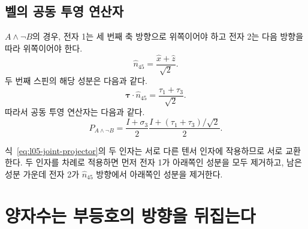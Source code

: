 \subsection{벨의 공동 투영 연산자}

\(A\wedge\neg B\)의 경우, 전자 1는 세 번째 축 방향으로 위쪽이어야 하고 전자 2는 다음 방향을 따라 위쪽이어야 한다.
\begin{equation}
  \hat n_{45}=\frac{\hat x+\hat z}{\sqrt2}.
\end{equation}
두 번째 스핀의 해당 성분은 다음과 같다.
\begin{equation}
  \boldsymbol{\tau}\cdot\hat n_{45}
  =
  \frac{\tau_1+\tau_3}{\sqrt2}.
\end{equation}
따라서 공동 투영 연산자는 다음과 같다.
\begin{equation}
  P_{A\wedge\neg B}
  =
  \frac{I+\sigma_3}{2}
  \frac{I+(\tau_1+\tau_3)/\sqrt2}{2}.
  \label{eq:l05-joint-projector}
\end{equation}

\begin{classroomqa}
\end{classroomqa}

\begin{classroomqa}
\end{classroomqa}

식~\eqref{eq:l05-joint-projector}의 두 인자는 서로 다른 텐서 인자에 작용하므로 서로 교환한다. 두 인자를 차례로 적용하면 먼저 전자 1가 아래쪽인 성분을 모두 제거하고, 남은 성분 가운데 전자 2가 \(\hat n_{45}\) 방향에서 아래쪽인 성분을 제거한다.

\section{양자수는 부등호의 방향을 뒤집는다}

